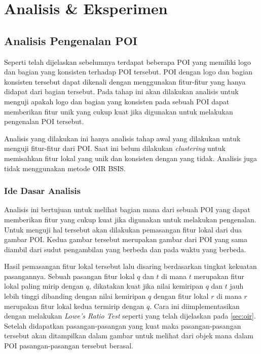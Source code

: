 \chapter{Analisis \& Eksperimen}
\label{chap:analisis}

\section{Analisis Pengenalan POI}
\label{sec:analisis_poi}
Seperti telah dijelaskan sebelumnya terdapat beberapa POI yang memiliki logo dan bagian yang konsisten terhadap POI tersebut. POI dengan logo dan bagian konsisten tersebut dapat dikenali dengan menggunakan fitur-fitur yang hanya didapat dari bagian tersebut. Pada tahap ini akan dilakukan analisis untuk menguji apakah logo dan bagian yang konsisten pada sebuah POI dapat memberikan fitur unik yang cukup kuat jika digunakan untuk melakukan pengenalan POI tersebut.

Analisis yang dilakukan ini hanya analisis tahap awal yang dilakukan untuk menguji fitur-fitur dari POI. Saat ini belum dilakukan \textit{clustering} untuk memisahkan fitur lokal yang unik dan konsisten dengan yang tidak. Analisis juga tidak menggunakan metode OIR BSIS.

\subsection{Ide Dasar Analisis}
Analisis ini bertujuan untuk melihat bagian mana dari sebuah POI yang dapat memberikan fitur yang cukup kuat jika digunakan untuk melakukan pengenalan. Untuk menguji hal tersebut akan dilakukan pemasangan fitur lokal dari dua gambar POI. Kedua gambar tersebut merupakan gambar dari POI yang sama diambil dari sudut pengambilan yang berbeda dan pada waktu yang berbeda. 

Hasil pemasangan fitur lokal tersebut lalu disaring berdasarkan tingkat kekuatan pasangannya. Sebuah pasangan fitur lokal $q$ dan $t$ di mana $t$ merupakan fitur lokal paling mirip dengan $q$, dikatakan kuat jika nilai kemiripan $q$ dan $t$ jauh lebih tinggi dibanding dengan nilai kemiripan $q$ dengan fitur lokal $r$ di mana $r$ merupakan fitur lokal kedua termirip dengan $q$. Cara ini diimplementasikan dengan melakukan \textit{Lowe's Ratio Test} seperti yang telah dijelaskan pada \ref{sec:oir}. Setelah didapatkan pasangan-pasangan yang kuat maka pasangan-pasangan tersebut akan ditampilkan dalam gambar untuk melihat dari objek mana dalam POI pasangan-pasangan tersebut berasal. 


